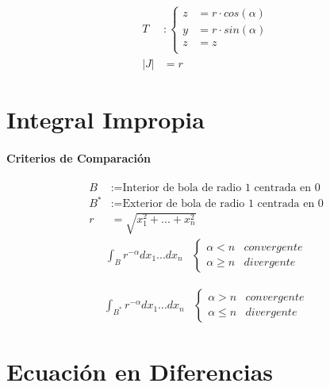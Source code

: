 \documentclass{article}
\begin{document}
\begin{multicols}{2}
        \begin{align*}
          T &:
          \begin{cases}
            z &= r \cdot cos(\alpha)\\
            y &= r \cdot sin(\alpha)\\
            z &= z \\
          \end{cases} \\
          \left|J\right| &= r
        \end{align*}

    \section{Integral Impropia}

      \paragraph{Criterios de Comparación}
        \begin{align*}
          B &:= \text{Interior de bola de radio 1 centrada en 0} \\
          B^* &:= \text{Exterior de bola de radio 1 centrada en 0} \\
          r &= \sqrt{x_1^2 + ... + x_n^2}
        \end{align*}
        \begin{align*}
          \int_B r^{-\alpha} dx_1...dx_n &
          \begin{cases}
            \alpha < n & convergente\\
            \alpha \geq n & divergente
          \end{cases}
        \end{align*}

        \begin{align*}
          \int_{B^*}r^{-\alpha} dx_1...dx_n &
          \begin{cases}
            \alpha > n & convergente\\
            \alpha \leq n & divergente
          \end{cases}
        \end{align*}
    \section{Ecuación en Diferencias}
  \end{multicols}
\end{document}
